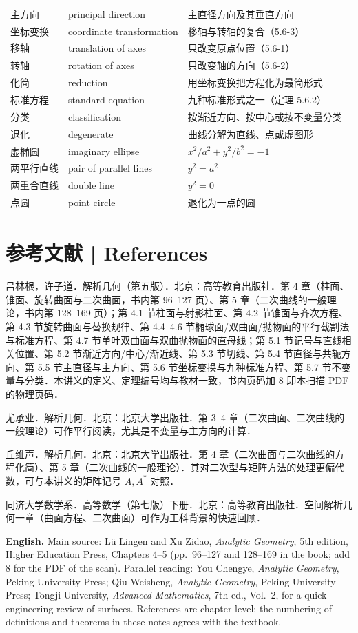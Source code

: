 \documentclass[UTF8,11pt,a4paper]{ctexart}
\newcommand{\EN}[1]{\par\noindent \textbf{English.} #1\par}
\theoremstyle{definition}
\begin{document}
\begin{small}
\begin{longtable}{@{}p{3.4cm}p{4.6cm}p{7.4cm}@{}}
主方向 & principal direction & 主直径方向及其垂直方向 \\
坐标变换 & coordinate transformation & 移轴与转轴的复合（5.6-3） \\
移轴 & translation of axes & 只改变原点位置（5.6-1） \\
转轴 & rotation of axes & 只改变轴的方向（5.6-2） \\
化简 & reduction & 用坐标变换把方程化为最简形式 \\
标准方程 & standard equation & 九种标准形式之一（定理 5.6.2） \\
分类 & classification & 按渐近方向、按中心或按不变量分类 \\
退化 & degenerate & 曲线分解为直线、点或虚图形 \\
虚椭圆 & imaginary ellipse & $x^2/a^2+y^2/b^2=-1$ \\
两平行直线 & pair of parallel lines & $y^2=a^2$ \\
两重合直线 & double line & $y^2=0$ \\
点圆 & point circle & 退化为一点的圆 \\
\end{longtable}
\end{small}

\section*{参考文献 | References}\label{sec:refs}
\noindent 吕林根，许子道．解析几何（第五版）．北京：高等教育出版社．第 4 章（柱面、锥面、旋转曲面与二次曲面，书内第 96--127 页）、第 5 章（二次曲线的一般理论，书内第 128--169 页）；第 4.1 节柱面与射影柱面、第 4.2 节锥面与齐次方程、第 4.3 节旋转曲面与替换规律、第 4.4--4.6 节椭球面/双曲面/抛物面的平行截割法与标准方程、第 4.7 节单叶双曲面与双曲抛物面的直母线；第 5.1 节记号与直线相关位置、第 5.2 节渐近方向/中心/渐近线、第 5.3 节切线、第 5.4 节直径与共轭方向、第 5.5 节主直径与主方向、第 5.6 节坐标变换与九种标准方程、第 5.7 节不变量与分类．本讲义的定义、定理编号均与教材一致，书内页码加 $8$ 即本扫描 PDF 的物理页码．\par
\noindent 尤承业．解析几何．北京：北京大学出版社．第 3--4 章（二次曲面、二次曲线的一般理论）可作平行阅读，尤其是不变量与主方向的计算．\par
\noindent 丘维声．解析几何．北京：北京大学出版社．第 4 章（二次曲面与二次曲线的方程化简）、第 5 章（二次曲线的一般理论）．其对二次型与矩阵方法的处理更偏代数，可与本讲义的矩阵记号 $A,A^*$ 对照．\par
\noindent 同济大学数学系．高等数学（第七版）下册．北京：高等教育出版社．空间解析几何一章（曲面方程、二次曲面）可作为工科背景的快速回顾．\par
\EN{Main source: Lü Lingen and Xu Zidao, \emph{Analytic Geometry}, 5th edition, Higher Education Press, Chapters 4--5 (pp.~96--127 and 128--169 in the book; add 8 for the PDF of the scan). Parallel reading: You Chengye, \emph{Analytic Geometry}, Peking University Press; Qiu Weisheng, \emph{Analytic Geometry}, Peking University Press; Tongji University, \emph{Advanced Mathematics}, 7th ed., Vol.~2, for a quick engineering review of surfaces. References are chapter-level; the numbering of definitions and theorems in these notes agrees with the textbook.}
\end{document}
